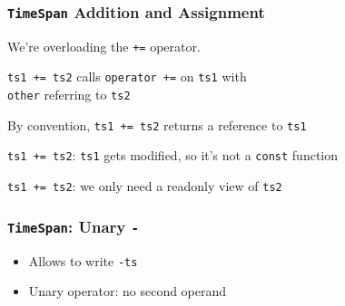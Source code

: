 \begin{frame}
  \frametitle{{\tt TimeSpan} Addition and Assignment}

  
  \begin{overprint}
    \begin{center}
      We're overloading the {\tt +=} operator.
    \end{center}

    \begin{center}
      {\tt ts1 += ts2} calls {\tt operator +=} on {\tt ts1} with \\ {\tt other} referring to {\tt ts2}
    \end{center}

    \begin{center}
      By convention, {\tt ts1 += ts2} returns a reference to {\tt ts1}
    \end{center}

    \begin{center}
      {\tt ts1 += ts2}: {\tt ts1} gets modified, so it's not a {\tt const} function
    \end{center}

    \begin{center}
      {\tt ts1 += ts2}: we only need a readonly view of {\tt ts2}
    \end{center}
  \end{overprint}
\end{frame}

\begin{frame}
  \frametitle{{\tt TimeSpan}: Unary {\tt -}}
  \begin{itemize}
    \item Allows to write {\tt -ts}
    \item Unary operator: no second operand
  \end{itemize}
\end{frame}

